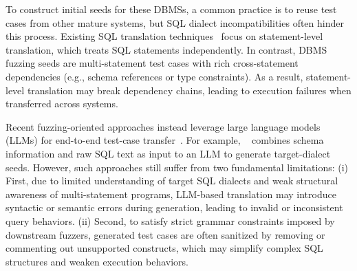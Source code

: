 \documentclass[conference]{IEEEtran}
\begin{document}
To construct initial seeds for these DBMSs, a common practice is to reuse test cases from other mature systems, but SQL dialect incompatibilities often hinder this process.
Existing SQL translation techniques~\cite{sqlglot,jooq,xie2026rise} focus on statement-level translation, which treats SQL statements independently. In contrast, DBMS fuzzing seeds are multi-statement test cases with rich cross-statement dependencies (e.g., schema references or type constraints). As a result, statement-level translation may break dependency chains, leading to execution failures when transferred across systems.

Recent fuzzing-oriented approaches instead leverage large language models (LLMs) for end-to-end test-case transfer~\cite{fu2024sedar, lin2025qtran}. For example, \sedar{}~\cite{fu2024sedar} combines schema information and raw SQL text as input to an LLM to generate target-dialect seeds. However, such approaches still suffer from two fundamental limitations: 
(i) First, due to limited understanding of target SQL dialects and weak structural awareness of multi-statement programs, LLM-based translation may introduce syntactic or semantic errors during generation, leading to invalid or inconsistent query behaviors.
(ii) Second, to satisfy strict grammar constraints imposed by downstream fuzzers, generated test cases are often sanitized by removing or commenting out unsupported constructs, which may simplify complex SQL structures and weaken execution behaviors.



\end{document}
